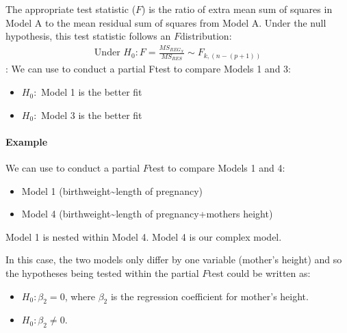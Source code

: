 \documentclass[letterpaper,10pt,english]{jupyterBook}
\begin{document}
\sphinxAtStartPar
The appropriate test statistic (\(F\)) is the ratio of extra mean sum of squares in Model A to the mean residual sum of squares from Model A. Under the null hypothesis, this test statistic follows an \(F\)\sphinxhyphen{}distribution:
\begin{equation*}
\begin{split}
\text{Under } H_0: F = \frac{MS_{REG_X}}{MS_{RES}} \sim F_{k,(n-(p+1))}
\end{split}
\end{equation*}
\sphinxAtStartPar
{}: We can use  to conduct a partial F\sphinxhyphen{}test to compare Models 1 and 3:
\begin{itemize}
\item {} 
\sphinxAtStartPar
\(H_0:\) Model 1 is the better fit

\item {} 
\sphinxAtStartPar
\(H_0:\) Model 3 is the better fit

\end{itemize}


\paragraph{Example}
\label{\detokenize{14.g. Linear Regression III:id2}}
\sphinxAtStartPar
We can use  to conduct a partial \(F\)\sphinxhyphen{}test to compare Models 1 and 4:
\begin{itemize}
\item {} 
\sphinxAtStartPar
Model 1 (birthweight\textasciitilde{}length of pregnancy)

\item {} 
\sphinxAtStartPar
Model 4 (birthweight\textasciitilde{}length of pregnancy+mothers height)

\end{itemize}

\sphinxAtStartPar
Model 1 is nested within Model 4. Model 4 is our complex model.

\sphinxAtStartPar
In this case, the two models only differ by one variable (mother’s height) and so the hypotheses being tested within the partial \(F\)\sphinxhyphen{}test could be written as:
\begin{itemize}
\item {} 
\sphinxAtStartPar
\(H_0: \beta_2=0\), where \(\beta_2\) is the regression coefficient for mother’s height.

\item {} 
\sphinxAtStartPar
\(H_0: \beta_2 \neq 0\).

\end{itemize}
\end{document}
